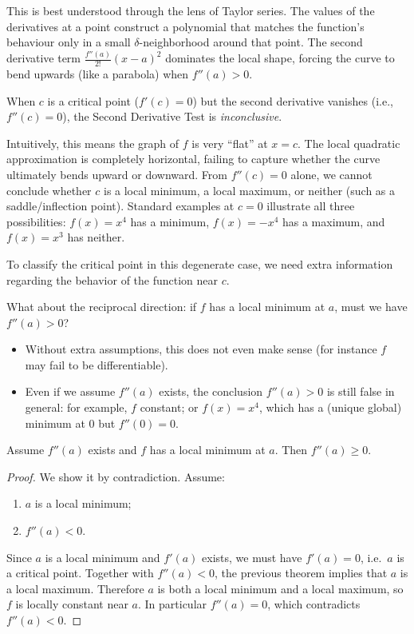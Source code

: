 \documentclass[../analysis1.tex]{subfiles}
\begin{document}
This is best understood through the lens of Taylor series. The values of the derivatives at a point construct a polynomial that matches the function's behaviour only in a small $\delta$-neighborhood around that point. The second derivative term $\frac{f''(a)}{2!}(x-a)^2$ dominates the local shape, forcing the curve to bend upwards (like a parabola) when $f''(a) > 0$.


\begin{remark}[The Degenerate Case $f''(c) = 0$]
    When $c$ is a critical point ($f'(c) = 0$) but the second derivative vanishes (i.e., $f''(c) = 0$), the Second Derivative Test is \textit{inconclusive}. 
    
    Intuitively, this means the graph of $f$ is very ``flat'' at $x=c$. The local quadratic approximation is completely horizontal, failing to capture whether the curve ultimately bends upward or downward. From $f''(c) = 0$ alone, we cannot conclude whether $c$ is a local minimum, a local maximum, or neither (such as a saddle/inflection point). Standard examples at $c=0$ illustrate all three possibilities: $f(x) = x^4$ has a minimum, $f(x) = -x^4$ has a maximum, and $f(x) = x^3$ has neither.
    
    To classify the critical point in this degenerate case, we need extra information regarding the behavior of the function near $c$.
\end{remark}

What about the reciprocal direction: if $f$ has a local minimum at $a$, must we have $f''(a) > 0$?
\begin{itemize}
    \item Without extra assumptions, this does not even make sense (for instance $f$ may fail to be differentiable).
    \item Even if we assume $f''(a)$ exists, the conclusion $f''(a) > 0$ is still false in general: for example, $f$ constant; or $f(x) = x^4$, which has a (unique global) minimum at $0$ but $f''(0) = 0$.
\end{itemize}

\begin{theorem}
    \begin{shaded*}
        Assume $f''(a)$ exists and $f$ has a local minimum at $a$. Then $f''(a) \ge 0$.
    \end{shaded*}
\end{theorem}
\begin{proof}
We show it by contradiction. Assume:
\begin{enumerate}
    \item $a$ is a local minimum;
    \item $f''(a) < 0$.
\end{enumerate}
Since $a$ is a local minimum and $f'(a)$ exists, we must have $f'(a) = 0$, i.e.\ $a$ is a critical point. Together with $f''(a) < 0$, the previous theorem implies that $a$ is a local maximum.
Therefore $a$ is both a local minimum and a local maximum, so $f$ is locally constant near $a$. In particular $f''(a) = 0$, which contradicts $f''(a) < 0$.\qedhere
\end{proof}
\end{document}
